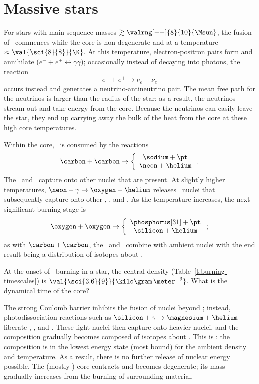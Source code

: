\section{Massive stars}

For stars with main-sequence masses $\gtrsim \valrng[--]{8}{10}{\Msun}$, the fusion of \carbon\ commences while the core is non-degenerate and at a temperature $\approx\val{\sci{8}{8}}{\K}$.  At this temperature, electron-positron pairs form and annihilate ($e^{-}+e^{+}\longleftrightarrow\gamma\gamma$); occasionally instead of decaying into photons, the reaction
\[ e^{-}+e^{+} \longrightarrow \nu_{e} + \bar{\nu}_{e}\]
occurs instead and generates a neutrino-antineutrino pair. The mean free path for the neutrinos is larger than the radius of the star; as a result, the neutrinos stream out and take energy from the core. Because the neutrinos can easily leave the star, they end up carrying away the bulk of the heat from the core at these high core temperatures.

Within the core, \carbon\ is consumed by the reactions
\[ \carbon+\carbon\to\left\{\begin{array}{c}\sodium+\pt \\\neon+\helium\end{array}\right.. \]
The \pt\ and \helium\ capture onto other nuclei that are present.  At slightly higher temperatures, $\neon+\gamma \to \oxygen+\helium$ releases \helium\ nuclei that subsequently capture onto other \oxygen, \neon, and \magnesium. As the temperature increases, the next significant burning stage is
\[\oxygen+\oxygen\to\left\{\begin{array}{c}\phosphorus[31]+\pt \\ \silicon+\helium \end{array}\right. ;\]
as with $\carbon+\carbon$, the \pt\ and \helium\ combine with ambient nuclei with the end result being a distribution of isotopes about \silicon.

\begin{exercisebox}
At the onset of \oxygen\ burning in a  star, the central density (Table~\ref{t.burning-timescales}) is $\val{\sci{3.6}{9}}{\kilo\gram\,\meter^{-3}}$.  What is the dynamical time of the core?
\end{exercisebox}

The strong Coulomb barrier inhibits the fusion of nuclei beyond \oxygen; instead, photodissociation reactions such as $\silicon+\gamma \to \magnesium+\helium$ liberate \nt, \pt, and \helium.  These light nuclei then capture onto heavier nuclei, and the composition gradually becomes composed of isotopes about \iron.  This is : the composition is in the lowest energy state (most bound) for the ambient density and temperature. As a result, there is no further release of nuclear energy possible. The (mostly \iron) core contracts and becomes degenerate; its mass gradually increases from the burning of surrounding material.

